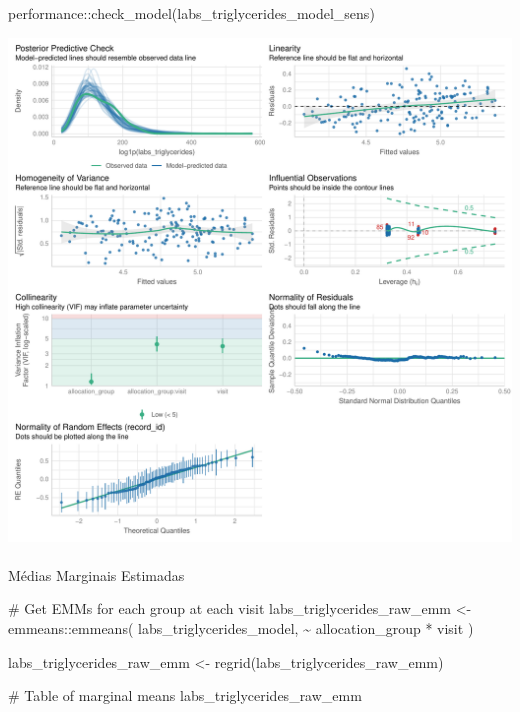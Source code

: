 \documentclass[
  letterpaper,
  DIV=11,
  numbers=noendperiod]{scrartcl}
\makeatletter
\let\oldparagraph\paragraph
\renewcommand{\paragraph}{
    \@ifstar
      \xxxParagraphStar
      \xxxParagraphNoStar
  }
\newcommand{\xxxParagraphStar}[1]{\oldparagraph*{#1}\mbox{}}
\newcommand{\xxxParagraphNoStar}[1]{\oldparagraph{#1}\mbox{}}
\newenvironment{Shaded}{\begin{snugshade}}{\end{snugshade}}
\newcommand{\CommentTok}[1]{\textcolor[rgb]{0.37,0.37,0.37}{#1}}
\newcommand{\FunctionTok}[1]{\textcolor[rgb]{0.28,0.35,0.67}{#1}}
\newcommand{\NormalTok}[1]{\textcolor[rgb]{0.00,0.23,0.31}{#1}}
\newcommand{\OtherTok}[1]{\textcolor[rgb]{0.00,0.23,0.31}{#1}}
\newcommand{\SpecialCharTok}[1]{\textcolor[rgb]{0.37,0.37,0.37}{#1}}
\makeatother
\begin{document}
\begin{Shaded}
\begin{Highlighting}[]
\NormalTok{performance}\SpecialCharTok{::}\FunctionTok{check\_model}\NormalTok{(labs\_triglycerides\_model\_sens)}
\end{Highlighting}
\end{Shaded}

\includegraphics{Outcomes_V1V2V3_files/figure-pdf/labs_triglycerides_4-2.pdf}

\paragraph{Médias Marginais
Estimadas}\label{muxe9dias-marginais-estimadas-7}

\begin{Shaded}
\begin{Highlighting}[]
\CommentTok{\# Get EMMs for each group at each visit}
\NormalTok{labs\_triglycerides\_raw\_emm }\OtherTok{\textless{}{-}}\NormalTok{ emmeans}\SpecialCharTok{::}\FunctionTok{emmeans}\NormalTok{(}
\NormalTok{    labs\_triglycerides\_model, }
    \SpecialCharTok{\textasciitilde{}}\NormalTok{ allocation\_group }\SpecialCharTok{*}\NormalTok{ visit}
\NormalTok{)}

\NormalTok{labs\_triglycerides\_raw\_emm }\OtherTok{\textless{}{-}} \FunctionTok{regrid}\NormalTok{(labs\_triglycerides\_raw\_emm)}

\CommentTok{\# Table of marginal means}
\NormalTok{labs\_triglycerides\_raw\_emm}
\end{Highlighting}
\end{Shaded}
\end{document}
